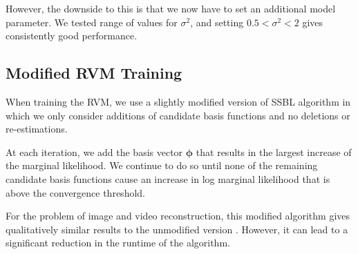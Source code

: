 However, the downside to this is that we now have to set an additional model parameter.
We tested range of values for $\sigma^2$, and setting $0.5 < \sigma^2 < 2$ gives consistently good performance.

\subsection{Modified RVM Training}
When training the RVM, we use a slightly modified version of SSBL algorithm in which we only consider additions of candidate basis functions and no deletions or re-estimations.

At each iteration, we add the basis vector $\bm\phi$ that results in the largest increase of the marginal likelihood.
We continue to do so until none of the remaining candidate basis functions cause an increase in log marginal likelihood that is above the convergence threshold.

For the problem of image and video reconstruction, this modified algorithm gives qualitatively similar results to the unmodified version \cite{pilikos2014}. However, it can lead to a significant reduction in the runtime of the algorithm.


